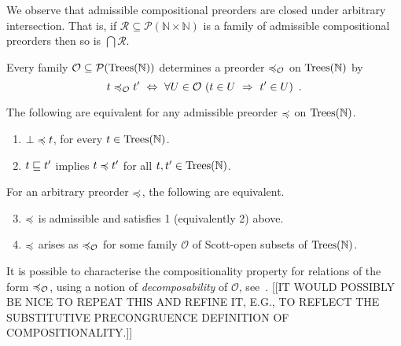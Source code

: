 We observe that admissible compositional preorders are closed under arbitrary intersection. That is, if
$\mathcal{R} \subseteq \mathcal{P}(\mathbb{N} \times \mathbb{N})$ is a family of admissible compositional preorders
then so is $\bigcap \mathcal{R}$.

Every family $\mathcal{O} \subseteq \mathcal{P}(\textnormal{Trees}(\mathbb{N}))$ determines a preorder $\preccurlyeq_\mathcal{O}$ on 
$\textnormal{Trees}(\mathbb{N})$ by
\begin{equation}
\label{equation:observational-preorder}
t \preccurlyeq_\mathcal{O} t' ~ \Leftrightarrow ~ \forall U \in \mathcal{O}~ (t \in U ~ \Rightarrow ~ t' \in U) \enspace .
\end{equation}

\begin{proposition} 
The following are equivalent for
any admissible  preorder  $\preccurlyeq$ on $\textnormal{Trees}(\mathbb{N})$.
\begin{enumerate} 
\item $\bot \preccurlyeq t$,  for every $t \in \textnormal{Trees}(\mathbb{N})$.
\item $t \sqsubseteq t'$ implies $t \preccurlyeq t'$ for all $t,t' \in \textnormal{Trees}(\mathbb{N})$.
\end{enumerate}
For an arbitrary preorder $\preccurlyeq$, the following are equivalent.
\begin{enumerate}
\setcounter{enumi}{2}
\item $\preccurlyeq$ is admissible and satisfies 1 (equivalently 2) above.
\item $\preccurlyeq$ arises as $\preccurlyeq_\mathcal{O}$ for some family $\mathcal{O}$ of Scott-open subsets
of $\textnormal{Trees}(\mathbb{N})$.
\end{enumerate}
\end{proposition}

It is possible to characterise the compositionality property for relations of the form $\preccurlyeq_\mathcal{O}$, using a notion of \emph{decomposability} of $\mathcal{O}$, see~\cite{gom}. 
[[IT WOULD POSSIBLY BE NICE TO REPEAT THIS AND REFINE IT, E.G., TO REFLECT THE SUBSTITUTIVE PRECONGRUENCE DEFINITION OF COMPOSITIONALITY.]]



